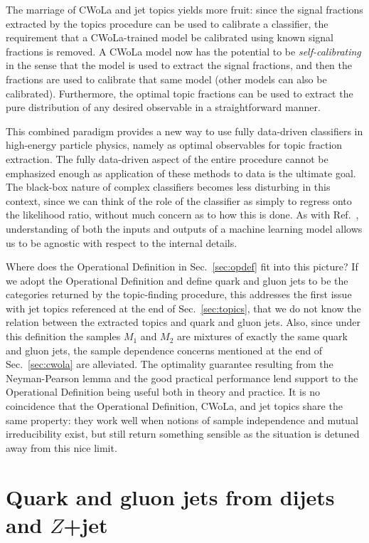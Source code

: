 \documentclass[letterpaper,11pt]{article}
\DeclareRobustCommand{\Sec}[1]{Sec.~\ref{#1}}
\DeclareRobustCommand{\Ref}[1]{Ref.~\cite{#1}}
\begin{document}
The marriage of CWoLa and jet topics yields more fruit: since the signal fractions extracted by the topics procedure can be used to calibrate a classifier, the requirement that a CWoLa-trained model be calibrated using known signal fractions is removed.
%
A CWoLa model now has the potential to be \emph{self-calibrating} in the sense that the model is used to extract the signal fractions, and then the fractions are used to calibrate that same model (other models can also be calibrated).
%
Furthermore, the optimal topic fractions can be used to extract the pure distribution of any desired observable in a straightforward manner.


This combined paradigm provides a new way to use fully data-driven classifiers in high-energy particle physics, namely as optimal observables for topic fraction extraction. 
%
The fully data-driven aspect of the entire procedure cannot be emphasized enough as application of these methods to data is the ultimate goal.
%
The black-box nature of complex classifiers becomes less disturbing in this context, since we can think of the role of the classifier as simply to regress onto the likelihood ratio, without much concern as to how this is done.
%
As with \Ref{Andreassen:2018apy}, understanding of both the inputs and outputs of a machine learning model allows us to be agnostic with respect to the internal details.


Where does the Operational Definition in \Sec{sec:opdef} fit into this picture?
%
If we adopt the Operational Definition and define quark and gluon jets to be the categories returned by the topic-finding procedure, this addresses the first issue with jet topics referenced at the end of \Sec{sec:topics}, that we do not know the relation between the extracted topics and quark and gluon jets.
%
Also, since under this definition the samples $M_1$ and $M_2$ are mixtures of exactly the same quark and gluon jets, the sample dependence concerns mentioned at the end of \Sec{sec:cwola} are alleviated.
%
The optimality guarantee resulting from the Neyman-Pearson lemma and the good practical performance lend support to the Operational Definition being useful both in theory and practice.
%
It is no coincidence that the Operational Definition, CWoLa, and jet topics share the same property: they work well when notions of sample independence and mutual irreducibility exist, but still return something sensible as the situation is detuned away from this nice limit.



\section{Quark and gluon jets from dijets and $Z$+jet}
\label{sec:qgex}
\end{document}
